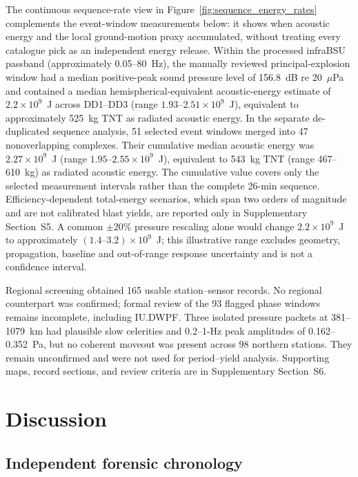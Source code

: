 \documentclass[]{seismica}
\begin{document}
The continuous sequence-rate view in
Figure~\ref{fig:sequence_energy_rates} complements the event-window
measurements below: it shows when acoustic energy and the local ground-motion
proxy accumulated, without treating every catalogue pick as an independent
energy release. Within the processed infraBSU passband (approximately
0.05--80~Hz), the manually reviewed principal-explosion window had a median positive-peak sound
pressure level of 156.8~dB re 20~$\mu$Pa and contained a median
hemispherical-equivalent acoustic-energy estimate of $2.2\times10^9$~J across DD1--DD3
(range $1.93$--$2.51\times10^9$~J), equivalent to approximately 525~kg TNT as
radiated acoustic energy. In the separate de-duplicated sequence analysis,
51 selected event windows merged into 47 nonoverlapping complexes. Their
cumulative median acoustic energy was $2.27\times10^9$~J
(range $1.95$--$2.55\times10^9$~J), equivalent to 543~kg TNT
(range 467--610~kg) as radiated acoustic energy. The cumulative value covers
only the selected measurement intervals rather than the complete 26-min
sequence. Efficiency-dependent total-energy scenarios, which span two orders
of magnitude and are not calibrated blast yields, are reported only in
Supplementary Section~S5. A common $\pm20\%$ pressure rescaling alone would
change $2.2\times10^9$~J to approximately $(1.4\text{--}3.2)\times10^9$~J;
this illustrative range excludes geometry, propagation, baseline and
out-of-range response uncertainty and is not a confidence interval.

Regional screening obtained 165 usable station--sensor records. No regional
counterpart was confirmed; formal review of the 93 flagged phase windows
remains incomplete, including IU.DWPF. Three isolated pressure
packets at 381--1079~km had plausible slow celerities and 0.2--1-Hz peak
amplitudes of 0.162--0.352~Pa, but no coherent moveout was present across 98
northern stations. They remain unconfirmed and were not used for period--yield
analysis. Supporting maps, record sections, and review criteria are in
Supplementary Section~S6.

\FloatBarrier

\section{Discussion}
\label{sec:discussion}

\subsection{Independent forensic chronology}
\end{document}
